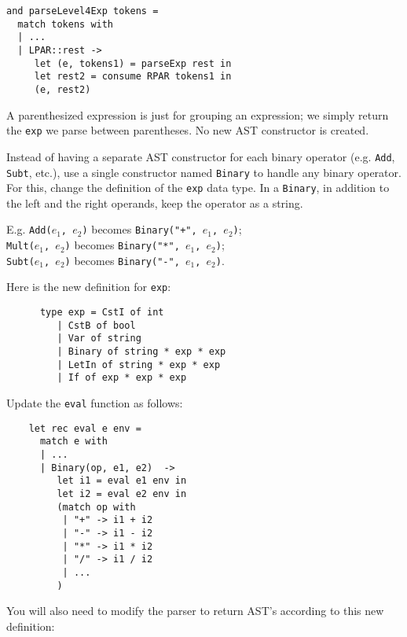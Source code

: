 \documentclass[addpoints]{exam}
\begin{document}
\begin{questions}
\begin{solution}
    \begin{verbatim}
and parseLevel4Exp tokens =
  match tokens with
  | ...
  | LPAR::rest ->
     let (e, tokens1) = parseExp rest in
     let rest2 = consume RPAR tokens1 in
     (e, rest2)
    \end{verbatim}

    A parenthesized expression is just for grouping an expression;
    we simply return the \texttt{exp} we parse between parentheses.
    No new AST constructor is created.
  \end{solution}
  
  \question
  Instead of having a separate AST constructor for
  each binary operator
  (e.g. \texttt{Add}, \texttt{Subt}, etc.),
  use a single constructor named \texttt{Binary}
  to handle any binary operator.
  For this, change the definition of the
  \texttt{exp} data type.
  In a \texttt{Binary},
  in addition to the left and the right operands,
  keep the operator as a string.
  
  E.g. \texttt{Add($e_1$, $e_2$)} becomes
  \texttt{Binary("+", $e_1$, $e_2$)};\\
  \texttt{Mult($e_1$, $e_2$)} becomes
  \texttt{Binary("*", $e_1$, $e_2$)};\\
  \texttt{Subt($e_1$, $e_2$)} becomes
  \texttt{Binary("-", $e_1$, $e_2$)}.
  
  \begin{solution}
    Here is the new definition for \texttt{exp}:
    \begin{verbatim}
      type exp = CstI of int
         | CstB of bool
         | Var of string
         | Binary of string * exp * exp
         | LetIn of string * exp * exp
         | If of exp * exp * exp
    \end{verbatim}

    Update the \texttt{eval} function as follows:

    \begin{verbatim}
    let rec eval e env =
      match e with
      | ...
      | Binary(op, e1, e2)  ->
         let i1 = eval e1 env in
         let i2 = eval e2 env in
         (match op with
          | "+" -> i1 + i2
          | "-" -> i1 - i2
          | "*" -> i1 * i2
          | "/" -> i1 / i2
          | ...
         )
    \end{verbatim}

    You will also need to modify the parser
    to return AST's according to this new definition:


\end{solution}
\end{questions}
\end{document}
